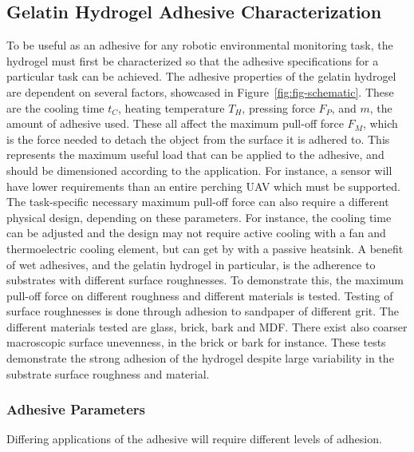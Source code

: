 \subsection{Gelatin Hydrogel Adhesive Characterization}
\label{subsec:gelatin_charac}

To be useful as an adhesive for any robotic environmental monitoring task, the hydrogel must first be characterized so that the adhesive specifications for a particular task can be achieved. The adhesive properties of the gelatin hydrogel are dependent on several factors, showcased in Figure~\ref{fig:fig-schematic}. These are the cooling time $t_C$, heating temperature $T_H$, pressing force $F_P$, and $m$, the amount of adhesive used. These all affect the maximum pull-off force $F_M$, which is the force needed to detach the object from the surface it is adhered to. This represents the maximum useful load that can be applied to the adhesive, and should be dimensioned according to the application. For instance, a sensor will have lower requirements than an entire perching UAV which must be supported. 
The task-specific necessary maximum pull-off force can also require a different physical design, depending on these parameters. For instance, the cooling time can be adjusted and the design may not require active cooling with a fan and thermoelectric cooling element, but can get by with a passive heatsink.
A benefit of wet adhesives, and the gelatin hydrogel in particular, is the adherence to substrates with different surface roughnesses. To demonstrate this, the maximum pull-off force on different roughness and different materials is tested. Testing of surface roughnesses is done through adhesion to sandpaper of different grit. The different materials tested are glass, brick, bark and MDF. There exist also coarser macroscopic  surface unevenness, in the brick or bark for instance.
These tests demonstrate the strong adhesion of the hydrogel despite large variability in the substrate surface roughness and material.

\subsubsection{Adhesive Parameters} %
Differing applications of the adhesive will require different levels of adhesion. 

